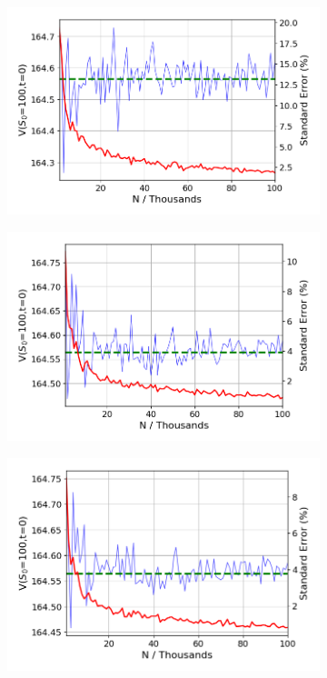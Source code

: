 \documentclass{article}
\begin{document}
\begin{figure}[!h]
\begin{minipage}{.5\textwidth}
  \centering
  \begin{subfigure}{\textwidth}
      \includegraphics[width=\linewidth]{confidence_100_normal.png}
      \label{fig:confidence1}
  \end{subfigure}
  \medskip
  \begin{subfigure}{\textwidth}
      \includegraphics[width=\linewidth]{confidence_100_antithetic.png}
      \label{fig:confidence2}
  \end{subfigure}
  \medskip
  \begin{subfigure}{\textwidth}
      \includegraphics[width=\linewidth]{confidence_100_momentmatch.png}

\end{subfigure}
\end{minipage}
\end{figure}
\end{document}
